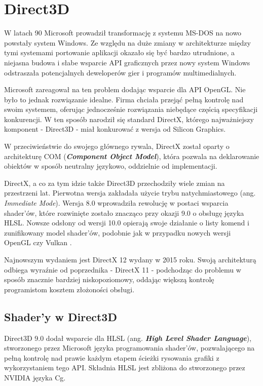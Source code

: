 \chapter{Direct3D}

W latach 90 Microsoft prowadził transformację z systemu MS-DOS na nowo
powstały system Windows. Ze względu na duże zmiany w architekturze
między tymi systemami portowanie aplikacji okazało się być bardzo
utrudnione, a niejasna budowa i słabe wsparcie API graficznych przez nowy system Windows
odstraszała potencjalnych deweloperów gier i programów multimedialnych.

Microsoft zareagował na ten problem dodając wsparcie dla API OpenGL. Nie było to jednak rozwiązanie idealne. Firma chciała
przejąć pełną kontrolę nad swoim systemem, oferując jednocześnie
rozwiązania niebędące częścią specyfikacji konkurencji. W ten sposób
narodził się standard DirectX, którego najważniejszy komponent -
Direct3D - miał konkurować z wersja od Silicon Graphics.

W przeciwieństwie do swojego głównego rywala, DirectX został oparty o
architekturę COM (\emph{\textbf{Component Object Model}}), która pozwala
na deklarowanie obiektów w sposób neutralny językowo, oddzielnie od
implementacji.

DirectX, a co za tym idzie także Direct3D przechodziły wiele zmian na
przestrzeni lat. Pierwotna wersja zakładała użycie trybu
natychmiastowego (ang. \emph{Immediate Mode}). Wersja 8.0
wprowadziła rewolucję w postaci wsparcia shader'ów, które rozwinięte
zostało znacząco przy okazji 9.0 o obsługę języka HLSL. Nowsze odsłony od wersji
10.0 opierają swoje działanie o listy komend i zunifikowany model
shader'ów, podobnie jak w przypadku nowych wersji OpenGL czy Vulkan \cite{wiki:direct3d:2024}.

Najnowszym wydaniem jest DirectX 12 wydany w 2015 roku. Swoją architekturą
odbiega wyraźnie od poprzednika - DirectX 11 - podchodząc do problemu
w sposób znacznie bardziej niskopoziomowy, oddając większą kontrolę
programistom kosztem złożoności obsługi.

\section{Shader'y w Direct3D}

Direct3D 9.0 dodał wsparcie dla HLSL (ang. \emph{\textbf{High Level Shader Language}}), stworzonego przez Microsoft języka programowania shader'ów, pozwalającego na pełną kontrolę nad prawie każdym etapem ścieżki rysowania grafiki z wykorzystaniem tego API. Składnia HLSL jest zbliżona do stworzonego przez NVIDIA języka Cg.

